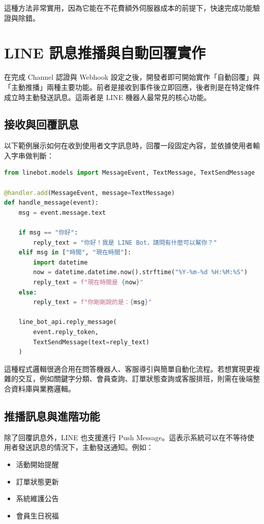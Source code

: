 這種方法非常實用，因為它能在不花費額外伺服器成本的前提下，快速完成功能驗證與除錯。

\chapter{LINE 訊息推播與自動回覆實作}

在完成 Channel 認證與 Webhook 設定之後，開發者即可開始實作「自動回覆」與「主動推播」兩種主要功能。前者是接收到事件後立即回應，後者則是在特定條件成立時主動發送訊息。這兩者是 LINE 機器人最常見的核心功能。

\section{接收與回覆訊息}

以下範例展示如何在收到使用者文字訊息時，回覆一段固定內容，並依據使用者輸入字串做判斷：

\begin{lstlisting}[language=Python, caption={接收使用者文字訊息並回覆範例}, label={lst:reply}]
from linebot.models import MessageEvent, TextMessage, TextSendMessage

@handler.add(MessageEvent, message=TextMessage)
def handle_message(event):
    msg = event.message.text

    if msg == "你好":
        reply_text = "你好！我是 LINE Bot，請問有什麼可以幫你？"
    elif msg in ["時間", "現在時間"]:
        import datetime
        now = datetime.datetime.now().strftime("%Y-%m-%d %H:%M:%S")
        reply_text = f"現在時間是 {now}"
    else:
        reply_text = f"你剛剛說的是：{msg}"

    line_bot_api.reply_message(
        event.reply_token,
        TextSendMessage(text=reply_text)
    )
\end{lstlisting}

這種程式邏輯很適合用在問答機器人、客服導引與簡單自動化流程。若想實現更複雜的交互，例如關鍵字分類、會員查詢、訂單狀態查詢或客服排班，則需在後端整合資料庫與業務邏輯。

\section{推播訊息與進階功能}

除了回覆訊息外，LINE 也支援進行 Push Message。這表示系統可以在不等待使用者發送訊息的情況下，主動發送通知。例如：

\begin{itemize}[leftmargin=2em]
    \item 活動開始提醒
    \item 訂單狀態更新
    \item 系統維護公告
    \item 會員生日祝福
\end{itemize}

